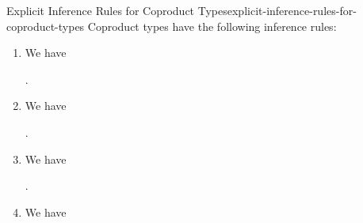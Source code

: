 \begin{remark}{Explicit Inference Rules for Coproduct Types}{explicit-inference-rules-for-coproduct-types}%
    Coproduct types have the following inference rules:
    \begin{enumerate}
        \item\label{explicit-inference-rules-for-coproduct-types-formation}We have
            \begin{webprooftree}%
                \begin{prooftree}%
                \end{prooftree}%
                .%
            \end{webprooftree}%
        \item\label{explicit-inference-rules-for-coproduct-types-introduction-1}We have
            \begin{webprooftree}%
                \begin{prooftree}%
                \end{prooftree}%
                .%
            \end{webprooftree}%
        \item\label{explicit-inference-rules-for-coproduct-types-introduction-2}We have
            \begin{webprooftree}%
                \begin{prooftree}%
                \end{prooftree}%
                .%
            \end{webprooftree}%
        \item\label{explicit-inference-rules-for-coproduct-types-induction}We have
            \begin{webprooftree}%
                \begin{prooftree}%

\end{prooftree}
\end{webprooftree}
\end{enumerate}
\end{remark}
